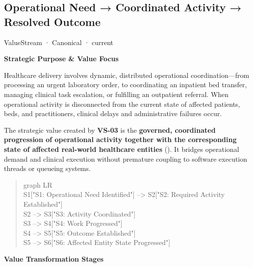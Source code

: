 \subsection{Operational Need → Coordinated Activity → Resolved Outcome}

\label{element:beea615ca7b34bbcbd0ad3a2a6ab2cff}
{\small ValueStream · Canonical · current}\par

\par\medskip\textbf{Strategic Purpose \& Value Focus}\par


Healthcare delivery involves dynamic, distributed operational coordination—from processing an urgent laboratory order, to coordinating an inpatient bed transfer, managing clinical task escalation, or fulfilling an outpatient referral. When operational activity is disconnected from the current state of affected patients, beds, and practitioners, clinical delays and administrative failures occur.



The strategic value created by \textbf{VS-03} is the \textbf{governed, coordinated progression of operational activity together with the corresponding state of affected real-world healthcare entities} (\texttt{}). It bridges operational demand and clinical execution without premature coupling to software execution threads or queueing systems.



\begin{quote}\small\ttfamily
graph LR\\
    S1["S1: Operational Need Identified"] --> S2["S2: Required Activity Established"]\\
    S2 --> S3["S3: Activity Coordinated"]\\
    S3 --> S4["S4: Work Progressed"]\\
    S4 --> S5["S5: Outcome Established"]\\
    S5 --> S6["S6: Affected Entity State Progressed"]\\

\end{quote}


\par\medskip\textbf{Value Transformation Stages}\par


